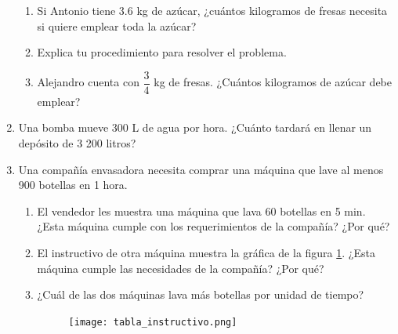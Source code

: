 \documentclass[11pt]{book}
\begin{document}
\begin{enumerate}
\begin{enumerate}
          \item Si Antonio tiene 3.6 kg de azúcar, ¿cuántos kilogramos de fresas necesita si quiere emplear toda la azúcar?
          \item Explica tu procedimiento para resolver el problema.
          \item Alejandro cuenta con $\dfrac{3}{4}$ kg de fresas. ¿Cuántos kilogramos de azúcar debe emplear?
        \end{enumerate}
  \item Una bomba mueve 300 L de agua por hora. ¿Cuánto tardará en llenar un depósito de 3 200 litros?
  \item Una compañía envasadora necesita comprar una máquina que lave al menos 900
        botellas en 1 hora.
        \begin{enumerate}
          \item El vendedor les muestra una máquina que lava 60 botellas en 5 min. ¿Esta máquina cumple con los requerimientos de la compañía? ¿Por qué?
          \item El instructivo de otra máquina muestra la gráfica de
                la figura \ref{fig:tabla_instructivo}. ¿Esta máquina cumple las necesidades de la compañía? ¿Por qué?

          \item ¿Cuál de las dos máquinas lava más botellas por unidad de tiempo?
                \begin{figure}[H]
                  \centering
                  \texttt{[image: tabla\_instructivo.png]}
                  \label{fig:tabla_instructivo}
                \end{figure}

        \end{enumerate}
\end{enumerate}
\end{document}
